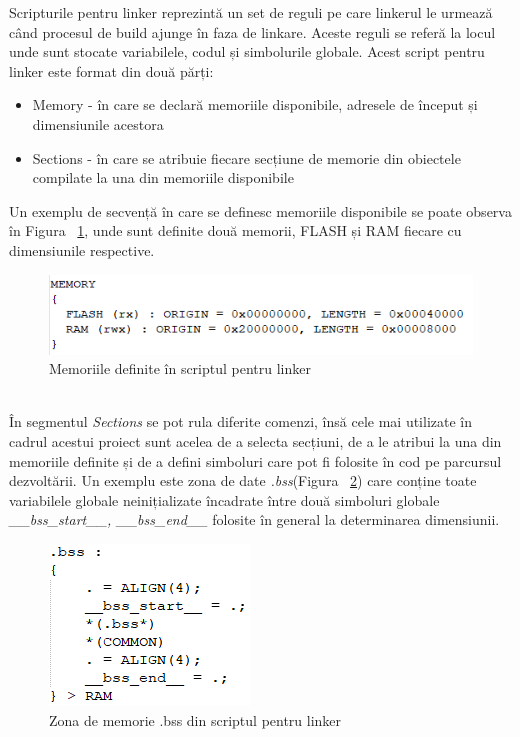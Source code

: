\documentclass[12pt,a4paper]{report}
\begin{document}
Scripturile pentru linker reprezintă un set de reguli pe care linkerul le urmează când procesul de build ajunge în faza de linkare. Aceste reguli se referă la locul unde sunt stocate variabilele, codul și simbolurile globale. Acest script pentru linker este format din două părți:
\begin{itemize}
\item{Memory - în care se declară memoriile disponibile, adresele de început și dimensiunile acestora}
\item{Sections - în care se atribuie fiecare secțiune de memorie din obiectele compilate la una din memoriile disponibile}
\end{itemize}
Un exemplu de secvență în care se definesc memoriile disponibile se poate observa în Figura ~\ref{fig:scriptmemory}, unde sunt definite două memorii, FLASH și RAM fiecare cu dimensiunile respective.
\begin{figure}[h]
\centering
\includegraphics[scale=0.9]{pics/scriptmemory.png}
  \caption{Memoriile definite în scriptul pentru linker}
  \label{fig:scriptmemory}
\end{figure}\\
În segmentul \textit{Sections} se pot rula diferite comenzi, însă cele mai utilizate în cadrul acestui proiect sunt acelea de a selecta secțiuni, de a le atribui la una din memoriile definite și de a defini simboluri care pot fi folosite în cod pe parcursul dezvoltării. Un exemplu este zona de date \textit{.bss}(Figura ~\ref{fig:bssscript}) care conține toate variabilele globale neinițializate încadrate între două simboluri globale \textit{\_\_bss\_start\_\_, \_\_bss\_end\_\_} folosite în general la determinarea dimensiunii.
\begin{figure}[h]
\centering
\includegraphics[scale=0.9]{pics/bss.png}
  \caption{Zona de memorie .bss din scriptul pentru linker}
  \label{fig:bssscript}
\end{figure}
\end{document}
